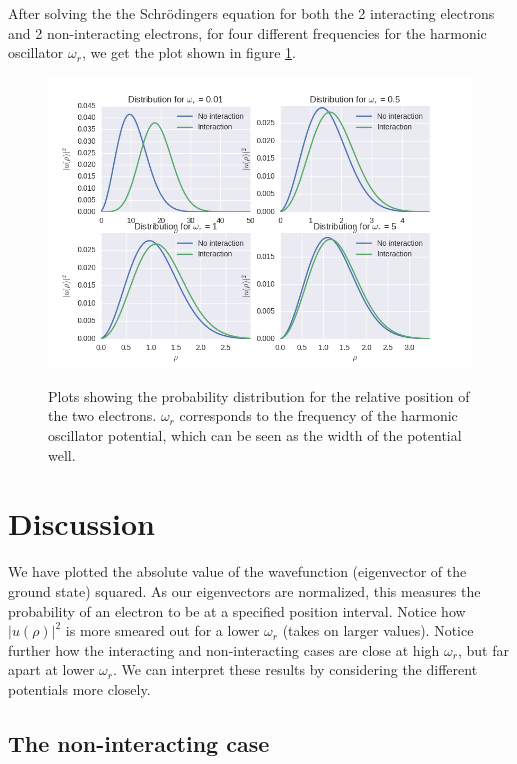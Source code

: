 \documentclass[a4paper, 10pt]{article}
\begin{document}
After solving the the Schrödingers equation for both the 2 interacting electrons and 2 non-interacting electrons, for four different frequencies for the harmonic oscillator $\omega_r$, we get the plot shown in figure \ref{fig:finfigur}.
\begin{center}
\begin{figure}[h!!]
\includegraphics[scale=0.6]{distribution_subplot.png}\label{fig:finfigur}
\caption{Plots showing the probability distribution for the relative position of the two electrons. $\omega_r$ corresponds to the frequency of the harmonic oscillator potential, which can be seen as the width of the potential well.}
\end{figure}
\end{center}

\section{Discussion}
We have plotted the absolute value of the wavefunction (eigenvector of the ground state) squared. As our eigenvectors are normalized, this measures the probability of an electron to be at a specified position interval. Notice how $|u(\rho)|^{2}$ is more smeared out for a lower $\omega_r$ (takes on larger values). Notice further how the interacting and non-interacting cases are close at high $\omega_r$, but far apart at lower $\omega_r$.   We can interpret these results by considering the different potentials more closely.
\subsection{The non-interacting case}
\end{document}
